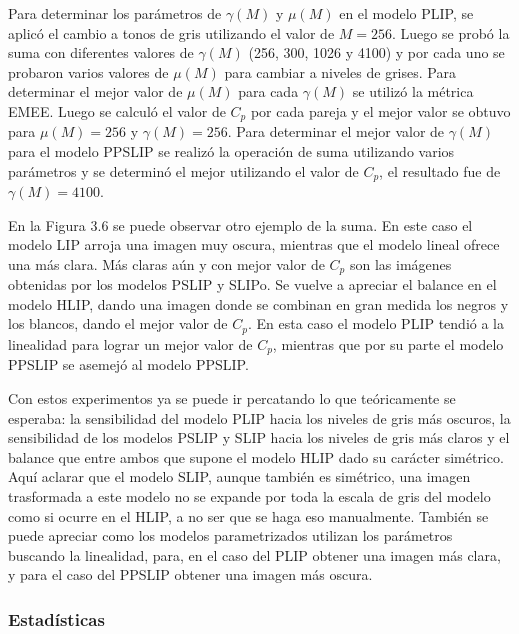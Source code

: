 Para determinar los par\'ametros de $\gamma(M)$ y $\mu(M)$ en el modelo PLIP, se aplic\'o el cambio a tonos de gris utilizando el valor de $M=256$. Luego se prob\'o la suma con diferentes valores de $\gamma(M)$ (256, 300, 1026 y 4100) y por cada uno se probaron varios valores de $\mu(M)$ para cambiar a niveles de grises. Para determinar el mejor valor de $\mu(M)$ para cada $\gamma(M)$ se utiliz\'o la m\'etrica EMEE. Luego se calcul\'o el valor de $C_p$ por cada pareja y el mejor valor se obtuvo para $\mu(M)=256$ y $\gamma(M)=256$. Para determinar el mejor valor de $\gamma(M)$ para el modelo PPSLIP se realiz\'o la operaci\'on de suma utilizando varios par\'ametros y se determin\'o el mejor utilizando el valor de $C_p$, el resultado fue de $\gamma(M)=4100$. 

En la Figura 3.6 se puede observar otro ejemplo de la suma. En este caso el modelo LIP arroja una imagen muy oscura, mientras que el modelo lineal ofrece una m\'as clara. M\'as claras a\'un y con mejor valor de $C_p$ son las im\'agenes obtenidas por los modelos PSLIP y SLIPo. Se vuelve a apreciar el balance en el modelo HLIP, dando una imagen donde se combinan en gran medida los negros y los blancos, dando el mejor valor de $C_p$. En esta caso el modelo PLIP tendi\'o a la linealidad para lograr un mejor valor de $C_p$, mientras que por su parte el modelo PPSLIP se asemej\'o al modelo PPSLIP.

Con estos experimentos ya se puede ir percatando lo que te\'oricamente se esperaba: la sensibilidad del modelo PLIP hacia los niveles de gris m\'as oscuros, la sensibilidad de los modelos PSLIP y SLIP hacia los niveles de gris m\'as claros y el balance que entre ambos que supone el modelo HLIP dado su car\'acter sim\'etrico. Aqu\'i aclarar que el modelo SLIP, aunque tambi\'en es sim\'etrico, una imagen trasformada a este modelo no se expande por toda la escala de gris del modelo como si ocurre en el HLIP, a no ser que se haga eso manualmente. Tambi\'en se puede apreciar como los modelos parametrizados utilizan los par\'ametros buscando la linealidad, para, en el caso del PLIP obtener una imagen m\'as clara, y para el caso del PPSLIP obtener una imagen m\'as oscura. 

\subsubsection{Estad\'isticas}

